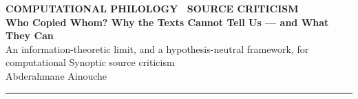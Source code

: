 \documentclass[11pt,letterpaper]{article}
\begin{document}
\thispagestyle{firstpage}
\begin{flushleft}
{\headfont\footnotesize\bfseries\color{terracotta}\MakeUppercase{Computational Philology \textbullet\ Source Criticism}}\\[7pt]
{\headfont\bfseries\fontsize{22}{27}\selectfont\color{marine}%
Who Copied Whom? Why the Texts Cannot Tell Us --- and What They Can}\\[9pt]
{\headfont\large\color{marinelight} An information-theoretic limit, and a hypothesis-neutral framework, for computational Synoptic source criticism}\\[11pt]
{\headfont\large\color{stone} Abderahmane Ainouche}
\end{flushleft}
\vspace{6pt}
{\color{rulegrey}\rule{\linewidth}{0.9pt}}
\vspace{1.3em}
\end{document}
